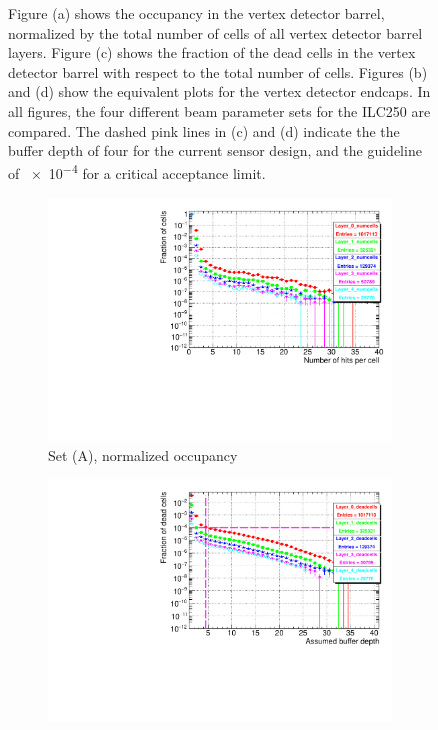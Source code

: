 \begin{figure}
{   Figure (a) shows the occupancy in the vertex detector barrel, normalized by the total number of cells of all vertex detector barrel layers.
   Figure (c) shows the fraction of the dead cells in the vertex detector barrel with respect to the total number of cells.
   Figures (b) and (d) show the equivalent plots for the vertex detector endcaps.
   In all figures, the four different beam parameter sets for the ILC250 are compared.
   The dashed pink lines in (c) and (d) indicate the the buffer depth of four for the current sensor design, and the guideline of \num{e-4} for a critical acceptance limit.
   }
   \label{fig:PairBkg:ILC250_Occupancy}
 \end{figure}
   \begin{figure}
 \centering
  \begin{subfigure}[b]{0.49\textwidth}
   \centering
    \includegraphics[width=\textwidth]{Figures/Pairs/Appendix/occupancy_numcells_SiVertexBarrel_ILC250_SetA_corrected_Barrel_size.pdf}
   \caption{Set (A), normalized occupancy}
   \end{subfigure}
   \hfill
    \begin{subfigure}[b]{0.49\textwidth}
   \centering
    \includegraphics[width=\textwidth]{Figures/Pairs/Appendix/occupancy_deadcells_SiVertexBarrel_ILC250_SetA_corrected_Barrel_size.pdf}

\end{subfigure}
\end{figure}

